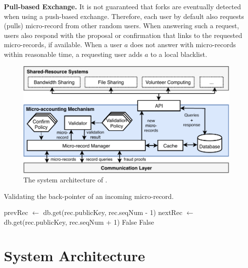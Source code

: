 \textbf{Pull-based Exchange.}
It is not guaranteed that forks are eventually detected when using a push-based exchange.
Therefore, each user by default also requests (pulls) micro-record from other random users.
When answering such a request, users also respond with the proposal or confirmation that links to the requested micro-records, if available.
When a user $ a $ does not answer with micro-records within reasonable time, a requesting user adds $ a $ to a local blacklist.

\begin{figure}[t]
	\centering
	\includegraphics[width=\linewidth]{trustchain/assets/system_architecture}
	\caption{The system architecture of \ModelName{}.}
	\label{fig:system_architecture}
\end{figure}

\begin{algorithm}[t]
	\label{alg:record_validation_step4}
	\caption{Validating the back-pointer of an incoming micro-record.}
	\begin{algorithmic}[1]
		
		  
		\State prevRec $ \leftarrow $ db.get(rec.publicKey, rec.seqNum - 1)
		\State nextRec $ \leftarrow $ db.get(rec.publicKey, rec.seqNum + 1)
		\State \Return False
		\EndIf
		\State \Return False
		\EndIf
		\EndProcedure
		
	\end{algorithmic}
\end{algorithm}

\section{System Architecture}
\label{sec:system_architecture}

